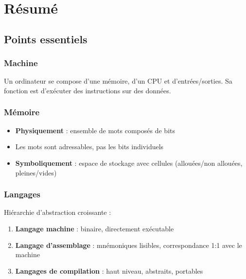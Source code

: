 \documentclass[12pt,a4paper]{article}
\begin{document}
\newpage
\section{Résumé}

\subsection{Points essentiels}

\subsubsection{Machine}

\begin{astuce}
Un ordinateur se compose d'une mémoire, d'un CPU et d'entrées/sorties. Sa fonction est d'exécuter des instructions sur des données.
\end{astuce}

\subsubsection{Mémoire}

\begin{important}
\begin{itemize}
    \item \textcolor{algoviolet}{\textbf{Physiquement}} : ensemble de mots composés de bits
    \item Les mots sont adressables, pas les bits individuels
    \item \textcolor{defvert}{\textbf{Symboliquement}} : espace de stockage avec cellules (allouées/non allouées, pleines/vides)
\end{itemize}
\end{important}

\subsubsection{Langages}

\begin{definition}
Hiérarchie d'abstraction croissante :
\begin{enumerate}
    \item \textcolor{importantrouge}{\textbf{Langage machine}} : binaire, directement exécutable
    \item \textcolor{exempleorange}{\textbf{Langage d'assemblage}} : mnémoniques lisibles, correspondance 1:1 avec le machine
    \item \textcolor{titrebleu}{\textbf{Langages de compilation}} : haut niveau, abstraits, portables
\end{enumerate}
\end{definition}
\end{document}
